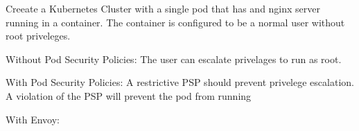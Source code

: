 Creeate a Kubernetes Cluster with a single pod that has and nginx server
running in a container. The container is configured to be a normal user
without root priveleges.

Without Pod Security Policies:
The user can escalate privelages to run as root.

With Pod Security Policies:
A restrictive PSP should prevent privelege escalation.
A violation of the PSP will prevent the pod from running

With Envoy:

